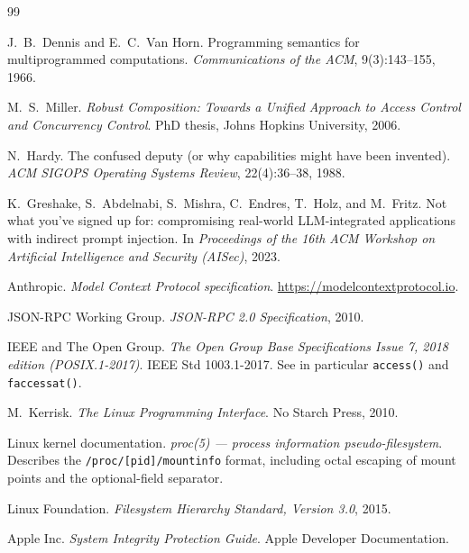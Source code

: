 \documentclass[11pt,a4paper]{article}
\newcommand{\code}[1]{\texttt{\small #1}}
\begin{document}
\begin{thebibliography}{99}
\small

J.~B.~Dennis and E.~C.~Van Horn.
\newblock Programming semantics for multiprogrammed computations.
\newblock \emph{Communications of the ACM}, 9(3):143--155, 1966.

M.~S.~Miller.
\newblock \emph{Robust Composition: Towards a Unified Approach to Access Control
  and Concurrency Control}.
\newblock PhD thesis, Johns Hopkins University, 2006.

N.~Hardy.
\newblock The confused deputy (or why capabilities might have been invented).
\newblock \emph{ACM SIGOPS Operating Systems Review}, 22(4):36--38, 1988.

K.~Greshake, S.~Abdelnabi, S.~Mishra, C.~Endres, T.~Holz, and M.~Fritz.
\newblock Not what you've signed up for: compromising real-world LLM-integrated
  applications with indirect prompt injection.
\newblock In \emph{Proceedings of the 16th ACM Workshop on Artificial
  Intelligence and Security (AISec)}, 2023.

Anthropic.
\newblock \emph{Model Context Protocol specification}.
\newblock \url{https://modelcontextprotocol.io}.

JSON-RPC Working Group.
\newblock \emph{JSON-RPC 2.0 Specification}, 2010.

IEEE and The Open Group.
\newblock \emph{The Open Group Base Specifications Issue 7, 2018 edition (POSIX.1-2017)}.
\newblock IEEE Std 1003.1-2017. See in particular \code{access()} and
  \code{faccessat()}.

M.~Kerrisk.
\newblock \emph{The Linux Programming Interface}.
\newblock No Starch Press, 2010.

Linux kernel documentation.
\newblock \emph{proc(5) --- process information pseudo-filesystem}.
\newblock Describes the \code{/proc/[pid]/mountinfo} format, including octal escaping
  of mount points and the optional-field separator.

Linux Foundation.
\newblock \emph{Filesystem Hierarchy Standard, Version 3.0}, 2015.

Apple Inc.
\newblock \emph{System Integrity Protection Guide}.
\newblock Apple Developer Documentation.


\end{thebibliography}
\end{document}
